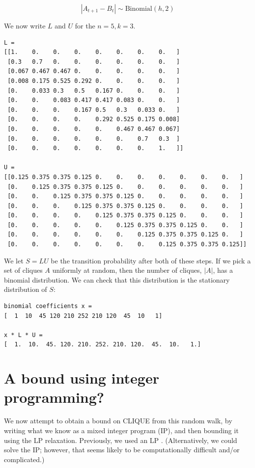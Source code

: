 \documentclass[12pt]{article}
\theoremstyle{definition}
\begin{document}
\[
|A_{t+1} - B_t| \sim \text{Binomial}(h, 2)
\]

We now write $L$ and $U$ for the $n=5, k=3$.

\begin{verbatim}
L =
[[1.    0.    0.    0.    0.    0.    0.    0.   ]
 [0.3   0.7   0.    0.    0.    0.    0.    0.   ]
 [0.067 0.467 0.467 0.    0.    0.    0.    0.   ]
 [0.008 0.175 0.525 0.292 0.    0.    0.    0.   ]
 [0.    0.033 0.3   0.5   0.167 0.    0.    0.   ]
 [0.    0.    0.083 0.417 0.417 0.083 0.    0.   ]
 [0.    0.    0.    0.167 0.5   0.3   0.033 0.   ]
 [0.    0.    0.    0.    0.292 0.525 0.175 0.008]
 [0.    0.    0.    0.    0.    0.467 0.467 0.067]
 [0.    0.    0.    0.    0.    0.    0.7   0.3  ]
 [0.    0.    0.    0.    0.    0.    0.    1.   ]]

U =
[[0.125 0.375 0.375 0.125 0.    0.    0.    0.    0.    0.    0.   ]
 [0.    0.125 0.375 0.375 0.125 0.    0.    0.    0.    0.    0.   ]
 [0.    0.    0.125 0.375 0.375 0.125 0.    0.    0.    0.    0.   ]
 [0.    0.    0.    0.125 0.375 0.375 0.125 0.    0.    0.    0.   ]
 [0.    0.    0.    0.    0.125 0.375 0.375 0.125 0.    0.    0.   ]
 [0.    0.    0.    0.    0.    0.125 0.375 0.375 0.125 0.    0.   ]
 [0.    0.    0.    0.    0.    0.    0.125 0.375 0.375 0.125 0.   ]
 [0.    0.    0.    0.    0.    0.    0.    0.125 0.375 0.375 0.125]]
\end{verbatim}

We let $S = LU$ be the transition probability after both of these steps.
If we pick a set of cliques $A$ uniformly at random,
then the number of cliques, $|A|$, has a binomial distribution.
We can check that this distribution
is the stationary distribution of $S$:

\begin{verbatim}
binomial coefficients x =
[  1  10  45 120 210 252 210 120  45  10   1]

x * L * U =
[  1.  10.  45. 120. 210. 252. 210. 120.  45.  10.   1.]
\end{verbatim}

\section{A bound using integer programming?}

We now attempt to obtain a bound on CLIQUE from this random walk, by
writing what we know as a mixed integer program (IP), and then bounding it
using the LP relaxation. Previously, we used an LP \cite{buggyclique}.
(Alternatively, we could solve the IP; however, that seems likely to
be computationally difficult and/or complicated.)
\end{document}
